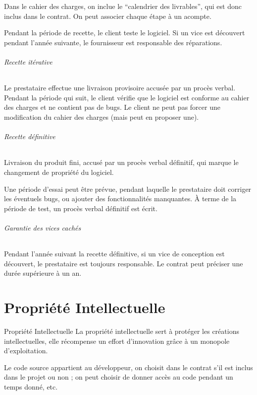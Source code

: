 \documentclass[10pt,a4paper,french]{article}
\begin{document}
Dans le cahier des charges, on inclue le ``calendrier des livrables'', qui est donc inclus dans le contrat. On peut associer chaque étape à un acompte.

Pendant la période de recette, le client teste le logiciel. Si un vice est découvert pendant l'année suivante, le fournisseur est responsable des réparations.

\paragraph{Recette itérative}
Le prestataire effectue une livraison provisoire accusée par un procès verbal. Pendant la période qui suit, le client vérifie que le logiciel est conforme au cahier des charges et ne contient pas de bugs. Le client ne peut pas forcer une modification du cahier des charges (mais peut en proposer une).

\paragraph{Recette définitive}
Livraison du produit fini, accusé par un procès verbal définitif, qui marque le changement de propriété du logiciel.

Une période d'essai peut être prévue, pendant laquelle le prestataire doit corriger les éventuels bugs, ou ajouter des fonctionnalités manquantes. À terme de la période de test, un procès verbal définitif est écrit.

\paragraph{Garantie des vices cachés}
Pendant l'année suivant la recette définitive, si un vice de conception est découvert, le prestataire est toujours responsable. Le contrat peut préciser une durée supérieure à un an.

\part{Propriété Intellectuelle}

\begin{cquote}{Propriété Intellectuelle}
La propriété intellectuelle sert à protéger les créations intellectuelles, elle récompense un effort d'innovation grâce à un monopole d'exploitation.
\end{cquote}

Le code source appartient au développeur, on choisit dans le contrat s'il est inclus dans le projet ou non ; on peut choisir de donner accès au code pendant un temps donné, etc.
\end{document}
